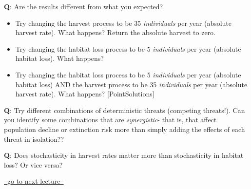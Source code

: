 \documentclass[
]{article}
\begin{document}
\textbf{Q}: Are the results different from what you expected?

\begin{itemize}
\item
  Try changing the harvest process to be 35 \emph{individuals} per year
  (absolute harvest rate). What happens? Return the absolute harvest to
  zero.
\item
  Try changing the habitat loss process to be 5 \emph{individuals} per
  year (absolute habitat loss). What happens?
\item
  Try changing the habitat loss process to be 5 \emph{individuals} per
  year (absolute habitat loss) AND the harvest process to be 35
  \emph{individuals} per year (absolute harvest rate). What happens?
  {[}PointSolutions{]}
\end{itemize}

\textbf{Q}: Try different combinations of deterministic threats
(competing threats!). Can you identify some combinations that are
\emph{synergistic}- that is, that affect population decline or
extinction risk more than simply adding the effects of each threat in
isolation??

\textbf{Q}: Does stochasticity in harvest rates matter more than
stochasticity in habitat loss? Or vice versa?

\href{LECTURE13.html}{--go to next lecture--}
\end{document}
